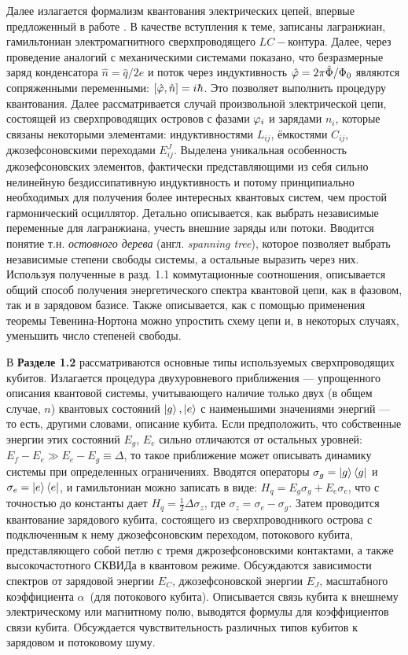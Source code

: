 Далее излагается формализм квантования электрических цепей, впервые предложенный в работе \cite{devoret1995quantum}. В качестве вступления к теме, записаны лагранжиан, гамильтониан электромагнитного сверхпроводящего $LC-$контура. Далее, через проведение аналогий с механическими системами показано, что безразмерные заряд конденсатора $\hat{n}=\hat{q}/2e$ и поток через индуктивность $\hat{\varphi}=2\pi\hat{\Phi}/\Phi_0$ являются сопряженными переменными: $[\hat{\vp},\hat{n}]=i\hbar$. Это позволяет выполнить процедуру квантования. Далее рассматривается случай произвольной электрической цепи, состоящей из сверхпроводящих островов с фазами $\varphi_i$ и зарядами $n_i$, которые связаны некоторыми элементами: индуктивностями $L_{ij}$, ёмкостями $C_{ij}$, джозефсоновскими переходами $E^J_{ij}$. Выделена уникальная особенность джозефсоновских элементов, фактически представляющими из себя сильно нелинейную бездиссипативную индуктивность и потому принципиально необходимых для получения более интересных квантовых систем, чем простой гармонический осциллятор. Детально описывается, как выбрать независимые переменные для лагранжиана, учесть внешние заряды или потоки. Вводится понятие т.н. \textit{остовного дерева} (англ. \textit{spanning tree}), которое позволяет выбрать независимые степени свободы системы, а остальные выразить через них. Используя полученные в разд. 1.1 коммутационные соотношения, описывается общий способ получения энергетического спектра квантовой цепи, как в фазовом, так и в зарядовом базисе. Также описывается, как с помощью применения теоремы Тевенина-Нортона можно упростить схему цепи и, в некоторых случаях, уменьшить число степеней свободы.

В \textbf{Разделе 1.2} рассматриваются основные типы используемых сверхпроводящих кубитов. Излагается процедура двухуровневого приближения --- упрощенного описания квантовой системы, учитывающего наличие только двух (в общем случае, $n$) квантовых состояний $\ket{g},\ket{e}$ с наименьшими значениями энергий --- то есть, другими словами, описание кубита. Если предположить, что собственные энергии этих состояний $E_g$, $E_e$ сильно отличаются от остальных уровней: $E_f-E_e\gg E_e-E_g \equiv \Delta$, то такое приближение может описывать динамику системы при определенных ограничениях. Вводятся операторы  $\sigma_g=\ket{g}\bra{g}$ и $\sigma_e = \ket{e}\bra{e}$,  и гамильтониан можно записать в виде: $H_q = E_g\sigma_g+E_e\sigma_e$, что с точностью до константы дает $H_q = \frac{1}{2}\Delta\sigma_z$, где $\sigma_z = \sigma_e-\sigma_g$. Затем проводится квантование зарядового кубита, состоящего из сверхпроводникого острова с подключенным к нему джозефсоновским переходом, потокового кубита, представляющего собой петлю с тремя джрозефсоновскими контактами, а также высокочастотного СКВИДа в квантовом режиме. Обсуждаются зависимости спектров от зарядовой энергии $E_C$, джозефсоновской энергии $E_J$, масштабного коэффициента $\alpha$~(для потокового кубита). Описывается связь кубита к внешнему электрическому или магнитному полю, выводятся формулы для коэффициентов связи кубита. Обсуждается чувствительность различных типов кубитов к зарядовом и потоковому шуму. 

